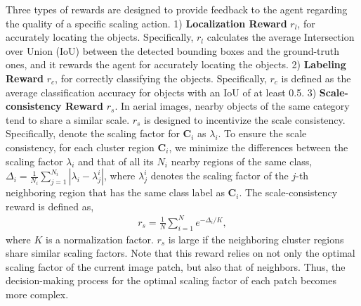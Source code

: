 \documentclass[letterpaper]{article} %
\newcommand\blue[1]{\textcolor{blue}{#1}}
\newcommand\rjf[1]{\textcolor{red}{\{RJF: #1\}}}
\begin{document}
Three types of rewards are designed to provide feedback to the agent regarding the quality of a specific scaling action. 1) \textbf{Localization Reward} $r_l$, for accurately locating the objects. Specifically, %
$r_l$ calculates the average Intersection over Union (IoU) between the detected bounding boxes and the ground-truth ones, and it rewards the agent for accurately locating the objects. 
2) \textbf{Labeling Reward} $r_c$, for correctly classifying the objects. %
Specifically, $r_c$ is defined as the average classification accuracy for objects with an IoU of at least 0.5. 
3) \textbf{Scale-consistency Reward} $r_s$. %
In aerial images, %
nearby objects of the same category tend to share a similar scale. $r_s$ is designed to incentivize the scale consistency. Specifically, denote the scaling factor for $\bm{C}_i$ as $\lambda_i$. To ensure the scale consistency, for each cluster region $\bm{C}_i$, we minimize the differences between the scaling factor $\lambda_i$ and that of all its $N_i$ nearby regions of the same class, $\Delta_i = \frac{1}{N_i}\sum_{j=1}^{N_i} |\lambda_i - \lambda_j^i|$, where $\lambda_j^i$ denotes the scaling factor of the $j$-th neighboring region that has the same class label as $\bm{C}_i$.
The scale-consistency reward is defined as, 
\begin{align}\label{eq:rs}
  r_s = \frac{1}{N}\sum_{i=1}^N e^{-\Delta_i/K}, 
\end{align}
where $K$ is a normalization factor. $r_s$ is large if the neighboring cluster regions share similar scaling factors. %
Note that this reward relies on not only the optimal scaling factor of the current image patch, but also that of neighbors. Thus, the decision-making process for the optimal scaling factor of each patch becomes more complex. 
\end{document}
